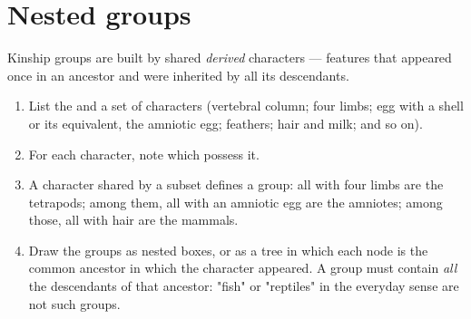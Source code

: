 \section{Nested groups}

\begin{method}\label{met:g10:common-ancestry:grouping}
Kinship groups are built by shared \emph{derived} characters ---
features that appeared once in an ancestor and were inherited by all
its descendants.
\begin{enumerate}
  \item List the  and a set of characters (vertebral column;
        four limbs; egg with a shell or its equivalent, the amniotic
        egg; feathers; hair and milk; and so on).
  \item For each character, note which  possess it.
  \item A character shared by a subset defines a group: all 
        with four limbs are the tetrapods; among them, all with an
        amniotic egg are the amniotes; among those, all with hair are
        the mammals.
  \item Draw the groups as nested boxes, or as a tree in which each
        node is the common ancestor in which the character appeared.
        A group must contain \emph{all} the descendants of that
        ancestor: "fish" or "reptiles" in the everyday sense are not
        such groups.
\end{enumerate}
\end{method}

